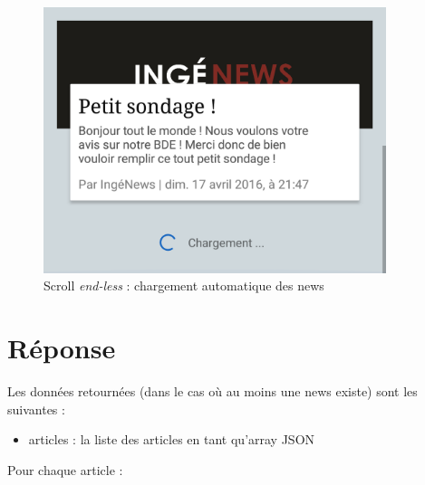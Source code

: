 \documentclass[12pt,a4paper,oneside]{report}
\begin{document}
\begin{figure}[h!]\centering
\includegraphics[width=10cm]{res/endless.png}
\caption{Scroll \textsl{end-less} : chargement automatique des news}
\end{figure}

\newpage

\section{Réponse}

Les données retournées (dans le cas où au moins une news existe) sont les suivantes :

\begin{itemize}
\item articles : la liste des articles en tant qu'array JSON
\end{itemize}

\noindent Pour chaque article :
\end{document}
